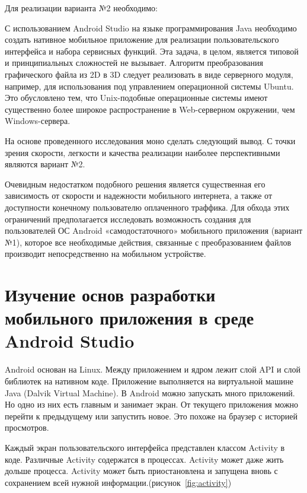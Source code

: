 Для реализации варианта №2 необходимо:

С использованием Android Studio на языке программирования Java необходимо создать нативное мобильное приложение для реализации пользовательского интерфейса и набора сервисных функций. Эта задача, в целом, является типовой и принципиальных сложностей не вызывает. Алгоритм преобразования графического файла из 2D в 3D следует реализовать в виде серверного модуля, например, для использования под управлением операционной системы Ubuntu. Это обусловлено тем, что Unix-подобные операционные системы имеют существенно более широкое распространение в Web-серверном окружении, чем Windows-сервера.

На основе проведенного исследования моно сделать следующий вывод. С точки зрения скорости, легкости и качества реализации наиболее перспективными являются вариант №2. 

Очевидным недостатком подобного решения является существенная его зависимость от скорости и надежности мобильного интернета, а также от доступности конечному пользователю оплаченного траффика. Для обхода этих ограничений предполагается исследовать возможность создания для пользователей ОС Android «самодостаточного» мобильного приложения (вариант №1), которое все необходимые действия, связанные с преобразованием файлов производит непосредственно на мобильном устройстве.

\section{Изучение основ разработки мобильного приложения в среде Android Studio}

Android основан на Linux. Между приложением и ядром лежит слой API и слой библиотек на нативном коде. Приложение выполняется на виртуальной машине Java (Dalvik Virtual Machine).
В Android можно запускать много приложений. Но одно из них есть главным и занимает экран. От текущего приложения можно перейти к предыдущему или запустить новое. Это похоже на браузер с историей просмотров.

Каждый экран пользовательского интерфейса представлен классом Activity в коде. Различные Activity содержатся в процессах. Activity может даже жить дольше процесса. Activity может быть приостановлена и запущена вновь с сохранением всей нужной информации.(рисунок~\ref{fig:activity})

